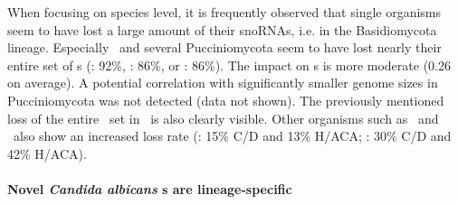 
When focusing on species level, it is frequently observed that single
organisms seem to have lost a large amount of their snoRNAs, i.e. in
the Basidiomycota lineage.  Especially \wse\ and several
Pucciniomycota seem to have lost nearly their entire set of \haca s
(\wse: 92\%, \rmi: 86\%, or \sli: 86\%). The impact on \cd s is more
moderate (0.26 on average). A potential correlation with significantly
smaller genome sizes in Pucciniomycota was not detected (data not
shown). The previously mentioned loss of the entire \haca\ set in
\Ptt\ is also clearly visible. Other organisms such as \pan\ and \opi\
also show an increased loss rate (\pan: 15\% C/D and 13\% H/ACA; \opi:
30\% C/D and 42\% H/ACA).



\paragraph{\textbf{Novel \emph{Candida albicans} \sno s are lineage-specific}}

